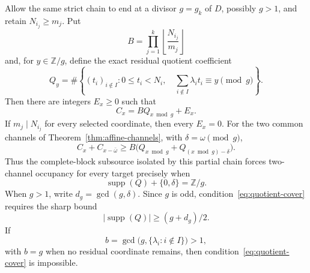\begin{theorem}
\label{thm:partial-chain}
Allow the same strict chain to end at a divisor $g=g_k$ of $D$, possibly
$g>1$, and retain $N_{i_j}\ge m_j$. Put
\[
 B=\prod_{j=1}^k\left\lfloor\frac{N_{i_j}}{m_j}\right\rfloor
\]
and, for $y\in\mathbb Z/g$, define the exact residual quotient coefficient
\[
 Q_y=\#\left\{(t_i)_{i\notin I}:0\le t_i<N_i,
 \quad\sum_{i\notin I}\lambda_it_i\equiv y\pmod g\right\}.
\]
Then there are integers $E_x\ge0$ such that
\begin{equation}\label{eq:partial-chain}
 C_x=BQ_{x\bmod g}+E_x.
\end{equation}
If $m_j\mid N_{i_j}$ for every selected coordinate, then every $E_x=0$.
For the two common channels of Theorem~\ref{thm:affine-channels}, with
$\delta=\omega\pmod g$,
\begin{equation}\label{eq:partial-pair}
 C_x+C_{x-\bar\omega}
 \ge B\bigl(Q_{x\bmod g}+Q_{(x\bmod g)-\delta}\bigr).
\end{equation}
Thus the complete-block subsource isolated by this partial chain forces
two-channel occupancy for every target precisely when
\begin{equation}\label{eq:quotient-cover}
 \operatorname{supp}(Q)+\{0,\delta\}=\mathbb Z/g.
\end{equation}
When $g>1$, write $d_g=\gcd(g,\delta)$. Since $g$ is odd,
condition~\eqref{eq:quotient-cover} requires the sharp bound
\begin{equation}\label{eq:quotient-support-bound}
 |\operatorname{supp}(Q)|\ge(g+d_g)/2.
\end{equation}
If
\[
 b=\gcd\bigl(g,\{\lambda_i:i\notin I\}\bigr)>1,
\]
with $b=g$ when no residual coordinate remains, then
condition~\eqref{eq:quotient-cover} is impossible.
\end{theorem}

